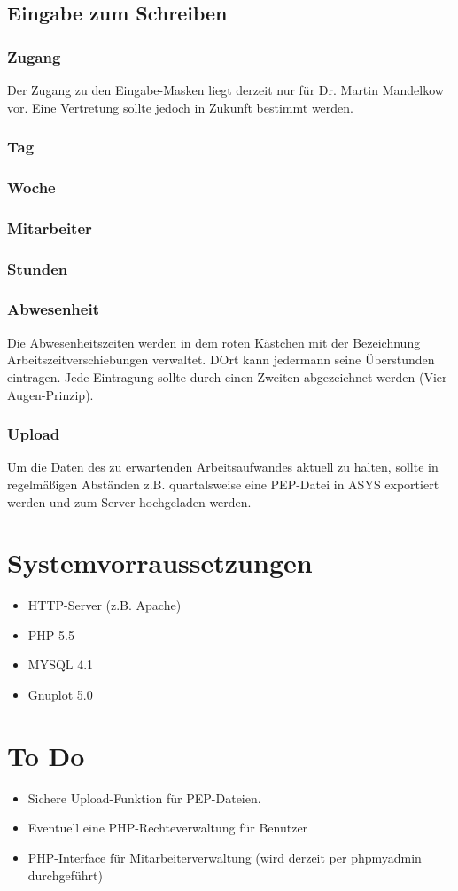 \documentclass[10pt,a4paper,titlepage,oneside]{article}
\begin{document}
\subsection{Eingabe zum Schreiben}
\subsubsection{Zugang}
Der Zugang zu den Eingabe-Masken liegt derzeit nur für Dr. Martin Mandelkow vor. Eine Vertretung sollte jedoch in Zukunft bestimmt werden.

\subsubsection{Tag}
\subsubsection{Woche}
\subsubsection{Mitarbeiter}
\subsubsection{Stunden}
\subsubsection{Abwesenheit}
Die Abwesenheitszeiten werden in dem roten Kästchen mit der Bezeichnung Arbeitszeitverschiebungen verwaltet. DOrt kann jedermann seine Überstunden eintragen. Jede Eintragung sollte durch einen Zweiten abgezeichnet werden (Vier-Augen-Prinzip).
\subsubsection{Upload}
Um die Daten des zu erwartenden Arbeitsaufwandes aktuell zu halten, sollte in regelmäßigen Abständen z.B. quartalsweise eine PEP-Datei in ASYS exportiert werden und zum Server hochgeladen werden.



\section{Systemvorraussetzungen}
	\begin{itemize}
		\item HTTP-Server (z.B. Apache)
		\item PHP 5.5
		\item MYSQL 4.1
		\item Gnuplot 5.0
	\end{itemize}










\section{To Do}
\begin{itemize}
	\item Sichere Upload-Funktion für PEP-Dateien.
	\item Eventuell eine PHP-Rechteverwaltung für Benutzer
	\item PHP-Interface für Mitarbeiterverwaltung (wird derzeit per phpmyadmin durchgeführt)
\end{itemize}
\end{document}
